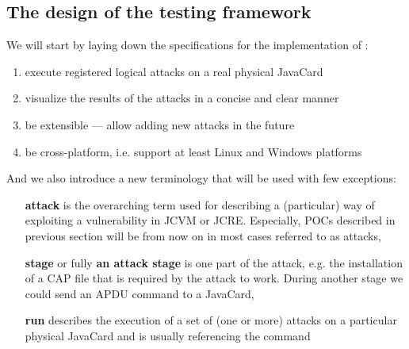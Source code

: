 \documentclass{../llncs/llncs}
\begin{document}
    \subsection{The design of the testing framework}

    We will start by laying down the specifications for the implementation of \projectname:
    \begin{enumerate}
        \item execute registered logical attacks on a real physical JavaCard
        \item visualize the results of the attacks in a concise and clear manner
        \item be extensible --- allow adding new attacks in the future
        \item be cross-platform, i.e. support at least Linux and Windows platforms
    \end{enumerate}


    And we also introduce a new terminology that will be used with few exceptions:

                \begin{enumerate}
                    \item[\textbf{attack}] is the overarching term used for describing a (particular) way of exploiting a vulnerability in JCVM or JCRE\@. Especially, POCs described in previous section will be from now on in most cases referred to as attacks,

                    \item[\textbf{stage}] or fully \textbf{an attack stage} is one part of the attack, e.g. the installation of a CAP file that is required by the attack to work. During another stage we could send an APDU command to a JavaCard,
                    \item[\textbf{run}] describes the execution of a set  of (one or more) attacks on a particular physical JavaCard and is usually referencing the \javusrun command
                \end{enumerate}
\end{document}

